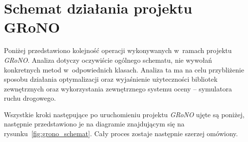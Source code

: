 \documentclass[twoside,12pt]{report}
\begin{document}
\section{Schemat działania projektu GRoNO}
Poniżej przedstawiono kolejność operacji wykonywanych w~ramach projektu \textit{GRoNO}. Analiza dotyczy oczywiście ogólnego schematu, nie wywołań konkretnych metod w~odpowiednich klasach. Analiza ta ma na celu przybliżenie sposobu działania optymalizacji oraz wyjaśnienie użyteczności bibliotek zewnętrznych oraz wykorzystania zewnętrznego systemu oceny -- symulatora ruchu drogowego.

Wszystkie kroki następujące po uruchomieniu projektu \textit{GRoNO} ujęte są poniżej, następnie przedstawiono je na diagramie znajdującym się na rysunku~\ref{fig:grono_schemat}. Cały proces zostaje następnie szerzej omówiony.
\end{document}
